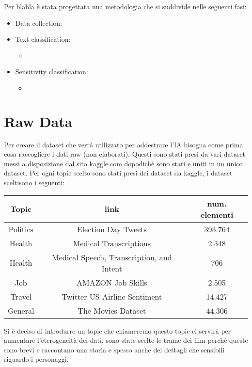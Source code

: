 Per blabla è stata progettata una metodologia che si suddivide nelle seguenti fasi:
\begin{itemize}
    \item Data collection:
    \item Text classification:
        \begin{itemize}
            \item 
        \end{itemize}
    \item Sensitivity classification:
        \begin{itemize}
            \item 
        \end{itemize}
\end{itemize}
\section{Raw Data}
Per creare il dataset che verrà utilizzato per addestrare l'IA bisogna come prima cosa raccogliere i dati raw (non elaborati). Questi sono stati presi da vari dataset messi a disposizione dal sito \href{https://www.kaggle.com/}{kaggle.com} dopodichè sono stati  e uniti in un unico dataset.
Per ogni topic scelto sono stati presi dei dataset da kaggle, i dataset sceltisono i seguenti:
\begin{table}[h]
\centering
\begin{tabular}{|c|c|c|}
\hline
\textbf{Topic} & \textbf{link} & \textbf{num. elementi} \\ \hline
Politics & Election Day Tweets & 393.764 \\ \hline
Health & Medical Transcriptions & 2.348 \\ \hline
Health & Medical Speech, Transcription, and Intent & 706 \\ \hline
Job & AMAZON Job Skills & 2.505 \\ \hline
Travel & Twitter US Airline Sentiment & 14.427 \\ \hline
General & The Movies Dataset & 44.306 \\ \hline
\end{tabular}
\end{table}
Si è deciso di introdurre un topic che chiameremo  questo topic ci servirà per aumentare l'eterogeneità dei dati, sono state scelte le trame dei film perchè queste sono brevi e raccontano una storia e spesso anche dei dettagli che sensibili riguardo i personaggi.

